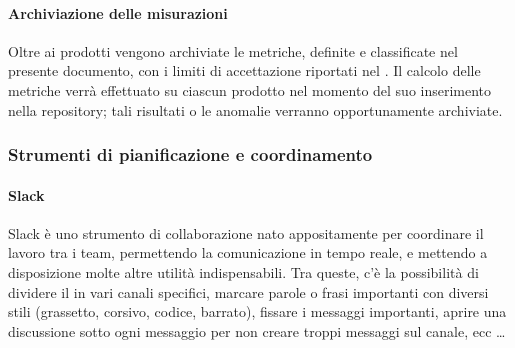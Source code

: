     		\paragraph{Archiviazione delle misurazioni}
			Oltre ai prodotti vengono archiviate le metriche, definite e classificate nel presente documento, con i limiti di accettazione riportati nel \Doc{\PdQv}.
			Il calcolo delle metriche verrà effettuato su ciascun prodotto nel momento del suo inserimento nella repository; tali risultati o le anomalie verranno
			opportunamente archiviate. %

    	\subsubsection{Strumenti di pianificazione e coordinamento}\label{pianificazione e coordinamento}

    		\paragraph{Slack}
			Slack è uno strumento di collaborazione nato appositamente per coordinare il lavoro tra i team, permettendo la comunicazione in tempo
			reale, e mettendo a disposizione molte altre utilità indispensabili. Tra queste, c'è la possibilità di dividere il  in vari canali
			specifici, marcare parole o frasi importanti con diversi stili (grassetto, corsivo, codice, barrato), fissare i messaggi importanti, aprire una discussione
			sotto ogni messaggio per non creare troppi messaggi sul canale, ecc \dots

